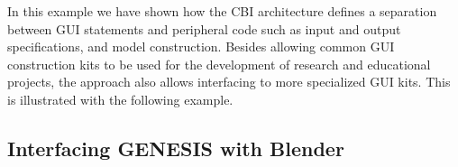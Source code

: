 \documentclass[12pt]{article}
\begin{document}







In this example we have shown how the CBI architecture defines a
separation between GUI statements and peripheral code such as input
and output specifications, and model construction.  Besides allowing
common GUI construction kits to be used for the development of
research and educational projects, the approach also allows
interfacing to more specialized GUI kits.  This is illustrated with
the following example.

\subsection{Interfacing GENESIS with Blender}

\end{document}
